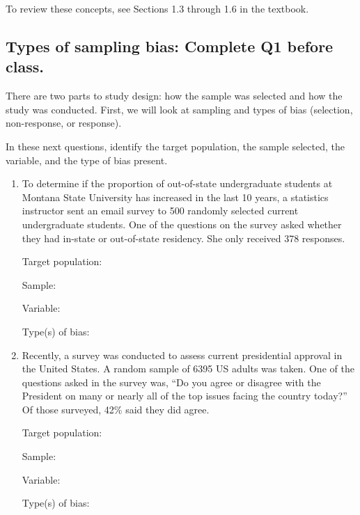 \documentclass[
]{report}
\begin{document}
To review these concepts, see Sections 1.3 through 1.6 in the textbook.

\newpage

\hypertarget{types-of-sampling-bias-complete-q1-before-class.}{%
\subsection{Types of sampling bias: Complete Q1 before class.}\label{types-of-sampling-bias-complete-q1-before-class.}}

There are two parts to study design: how the sample was selected and how the study was conducted. First, we will look at sampling and types of bias (selection, non-response, or response).

In these next questions, identify the target population, the sample selected, the variable, and the type of bias present.

\begin{enumerate}
\def\labelenumi{\arabic{enumi}.}
\item
  To determine if the proportion of out-of-state undergraduate students at Montana State University has increased in the last 10 years, a statistics instructor sent an email survey to 500 randomly selected current undergraduate students. One of the questions on the survey asked whether they had in-state or out-of-state residency. She only received 378 responses.
  \vspace{0.25in}

  Target population:
  \vspace{0.3in}

  Sample:
  \vspace{0.3in}

  Variable:
  \vspace{0.3in}

  Type(s) of bias:
  \vspace{0.3in}
\item
  Recently, a survey was conducted to assess current presidential approval in the United States. A random sample of 6395 US adults was taken. One of the questions asked in the survey was, ``Do you agree or disagree with the President on many or nearly all of the top issues facing the country today?'' Of those surveyed, 42\% said they did agree.
  \vspace{0.25in}

  Target population:
  \vspace{0.3in}

  Sample:
  \vspace{0.3in}

  Variable:
  \vspace{0.3in}

  Type(s) of bias:
  \vspace{0.3in}
\end{enumerate}
\end{document}
